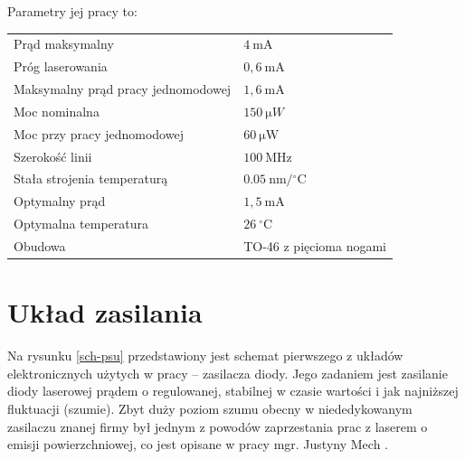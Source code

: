 \documentclass[a4paper,10pt,twoside]{report}
\begin{document}
Parametry jej pracy to:
\begin{center}
\begin{tabular}{ll}
Prąd maksymalny & $4 ~\mathrm{mA}$\\
Próg laserowania & $0{,}6~\mathrm{mA}$\\
Maksymalny prąd pracy jednomodowej & $1{,}6~\mathrm{mA}$\\
Moc nominalna & $150~\mathrm{\mu }W$\\
Moc przy pracy jednomodowej & $60~\mathrm{\mu W}$\\
Szerokość linii & $100~\mathrm{MHz}$\\
Stała strojenia temperaturą & $0.05 ~\mathrm{nm/{}^{\circ}C}$\\
Optymalny prąd & $1{,}5 ~\mathrm{mA}$\\
Optymalna temperatura & $26~\mathrm{ {}^{\circ}C}$ \\
Obudowa & TO-46 z pięcioma nogami
\end{tabular}
\end{center}


\section{Układ zasilania}

Na rysunku \ref{sch-psu} przedstawiony jest schemat pierwszego z układów elektronicznych użytych w pracy -- zasilacza diody. Jego zadaniem jest zasilanie diody laserowej prądem o regulowanej, stabilnej w czasie wartości i jak najniższej fluktuacji (szumie). Zbyt duży poziom szumu obecny w niededykowanym zasilaczu znanej firmy był jednym z powodów zaprzestania prac z laserem o emisji powierzchniowej, co jest opisane w pracy mgr. Justyny Mech \cite{mgrJustynaMech}.
\end{document}
